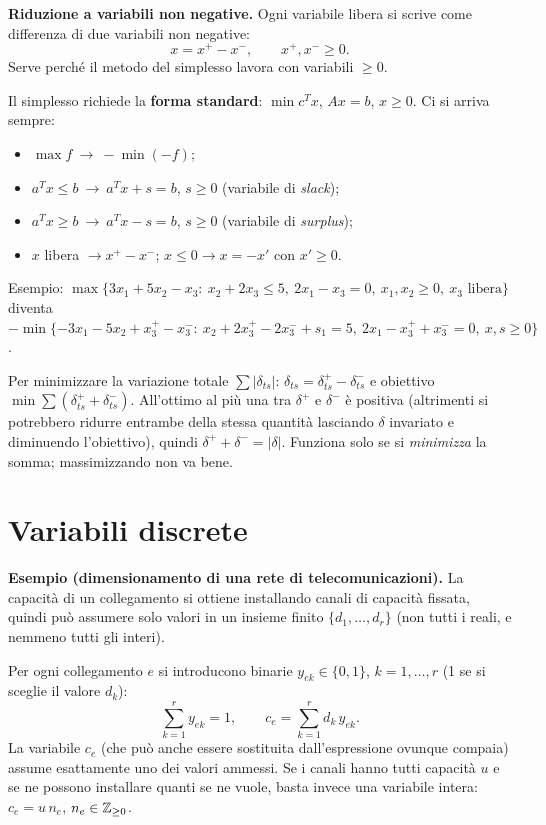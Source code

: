\textbf{Riduzione a variabili non negative.} Ogni variabile libera si scrive come differenza di due variabili non negative:
\[ x=x^+-x^-,\qquad x^+,x^-\ge0. \]
Serve perché il metodo del simplesso lavora con variabili $\ge0$.

\begin{extra}
Il simplesso richiede la \textbf{forma standard}: $\min c^Tx$, $Ax=b$, $x\ge0$. Ci si arriva sempre:
\begin{itemize}[nosep]
\item $\max f\ \to\ -\min(-f)$;
\item $a^Tx\le b\ \to\ a^Tx+s=b$, $s\ge0$ (variabile di \emph{slack});
\item $a^Tx\ge b\ \to\ a^Tx-s=b$, $s\ge0$ (variabile di \emph{surplus});
\item $x$ libera $\to x^+-x^-$; $x\le0\to x=-x'$ con $x'\ge0$.
\end{itemize}
Esempio: $\max\{3x_1+5x_2-x_3:\ x_2+2x_3\le5,\ 2x_1-x_3=0,\ x_1,x_2\ge0,\ x_3\text{ libera}\}$ diventa
$-\min\{-3x_1-5x_2+x_3^+-x_3^-:\ x_2+2x_3^+-2x_3^-+s_1=5,\ 2x_1-x_3^++x_3^-=0,\ x,s\ge0\}$.
\end{extra}

\begin{oss}
Per minimizzare la variazione totale $\sum|\delta_{ts}|$: $\delta_{ts}=\delta_{ts}^+-\delta_{ts}^-$ e obiettivo $\min\sum(\delta_{ts}^++\delta_{ts}^-)$. All'ottimo al più una tra $\delta^+$ e $\delta^-$ è positiva (altrimenti si potrebbero ridurre entrambe della stessa quantità lasciando $\delta$ invariato e diminuendo l'obiettivo), quindi $\delta^++\delta^-=|\delta|$. Funziona solo se si \emph{minimizza} la somma; massimizzando non va bene.
\end{oss}

\section{Variabili discrete}\label{sec:discrete}

\textbf{Esempio (dimensionamento di una rete di telecomunicazioni).} La capacità di un collegamento si ottiene installando canali di capacità fissata, quindi può assumere solo valori in un insieme finito $\{d_1,\dots,d_r\}$ (non tutti i reali, e nemmeno tutti gli interi).

Per ogni collegamento $e$ si introducono binarie $y_{ek}\in\{0,1\}$, $k=1,\dots,r$ (1 se si sceglie il valore $d_k$):
\[ \sum_{k=1}^r y_{ek}=1,\qquad c_e=\sum_{k=1}^r d_k\,y_{ek}. \]
La variabile $c_e$ (che può anche essere sostituita dall'espressione ovunque compaia) assume esattamente uno dei valori ammessi. Se i canali hanno tutti capacità $u$ e se ne possono installare quanti se ne vuole, basta invece una variabile intera: $c_e=u\,n_e$, $n_e\in\mathbb{Z}_{\ge0}$.

